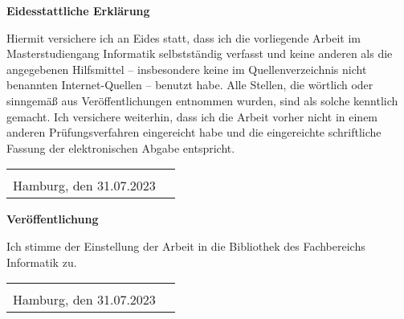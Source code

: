 
\thispagestyle{empty}
\pagestyle{empty}

\begin{center}
	\Large
	\textbf{Eidesstattliche Erklärung}
\end{center}
\noindent
Hiermit versichere ich an Eides statt, dass ich die vorliegende Arbeit im Masterstudiengang Informatik selbstständig verfasst und keine anderen als die angegebenen Hilfsmittel -- insbesondere keine im Quellenverzeichnis nicht benannten Internet-Quellen -- benutzt habe. Alle Stellen, die wörtlich oder sinngemäß aus Veröffentlichungen entnommen wurden, sind als solche kenntlich gemacht. Ich versichere weiterhin, dass ich die Arbeit vorher nicht in einem anderen Prüfungsverfahren eingereicht habe und die eingereichte schriftliche Fassung der elektronischen Abgabe entspricht.

\vspace*{1cm}
\noindent
\begin{tabularx}{\textwidth}{@{}Xr@{}}
	&
	\begin{tabular}{@{}l@{}}
		\makebox[5cm]{}\\ %
		\hline
	\end{tabular}
	\\
	\noindent
	Hamburg, den 31.07.2023
	&
	\makebox[5cm]{Hauke Stieler}
\end{tabularx}

\vspace*{3cm}

\begin{center}
	\Large
	\textbf{Veröffentlichung}
\end{center}
\noindent
Ich stimme der Einstellung der Arbeit in die Bibliothek des Fachbereichs Informatik zu.

\vspace*{1cm}
\noindent
\begin{tabularx}{\textwidth}{@{}Xr@{}}
	&
	\begin{tabular}{@{}l@{}}
		\makebox[5cm]{}\\ %
		\hline
	\end{tabular}
	\\
	\noindent
	Hamburg, den 31.07.2023
	&
	\makebox[5cm]{Hauke Stieler}
\end{tabularx}